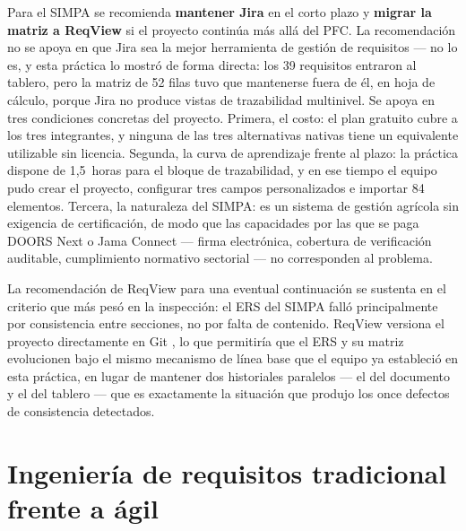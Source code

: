 \documentclass[11pt,letterpaper]{article}
\begin{document}
Para el SIMPA se recomienda \textbf{mantener Jira} en el corto plazo y \textbf{migrar la matriz a ReqView} si
el proyecto continúa más allá del PFC. La recomendación no se apoya en que Jira sea la mejor
herramienta de gestión de requisitos --- no lo es, y esta práctica lo mostró de forma directa: los
39 requisitos entraron al tablero, pero la matriz de 52 filas tuvo que mantenerse fuera de él, en
hoja de cálculo, porque Jira no produce vistas de trazabilidad multinivel. Se apoya en tres
condiciones concretas del proyecto. Primera, el costo: el plan gratuito cubre a los tres
integrantes, y ninguna de las tres alternativas nativas tiene un equivalente utilizable sin
licencia. Segunda, la curva de aprendizaje frente al plazo: la práctica dispone de 1,5~horas para
el bloque de trazabilidad, y en ese tiempo el equipo pudo crear el proyecto, configurar tres campos
personalizados e importar 84 elementos. Tercera, la naturaleza del SIMPA: es un sistema de gestión
agrícola sin exigencia de certificación, de modo que las capacidades por las que se paga DOORS Next
o Jama Connect --- firma electrónica, cobertura de verificación auditable, cumplimiento normativo
sectorial --- no corresponden al problema.

La recomendación de ReqView para una eventual continuación se sustenta en el criterio que más pesó
en la inspección: el ERS del SIMPA falló principalmente por consistencia entre secciones, no por
falta de contenido. ReqView versiona el proyecto directamente en Git \cite{reqview}, lo que
permitiría que el ERS y su matriz evolucionen bajo el mismo mecanismo de línea base que el equipo ya
estableció en esta práctica, en lugar de mantener dos historiales paralelos --- el del documento y
el del tablero --- que es exactamente la situación que produjo los once defectos de consistencia
detectados.

\section{Ingeniería de requisitos tradicional frente a ágil}
\end{document}
